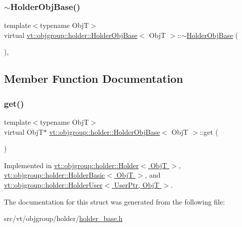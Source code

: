 \subsubsection{\texorpdfstring{$\sim$\+Holder\+Obj\+Base()}{~HolderObjBase()}}
{\footnotesize\ttfamily template$<$typename ObjT$>$ \\
virtual \hyperlink{structvt_1_1objgroup_1_1holder_1_1_holder_obj_base}{vt\+::objgroup\+::holder\+::\+Holder\+Obj\+Base}$<$ ObjT $>$\+::$\sim$\hyperlink{structvt_1_1objgroup_1_1holder_1_1_holder_obj_base}{Holder\+Obj\+Base} (\begin{DoxyParamCaption}{ }\end{DoxyParamCaption})\hspace{0.3cm}{\ttfamily [virtual]}, {\ttfamily [default]}}



\subsection{Member Function Documentation}
\mbox{\label{structvt_1_1objgroup_1_1holder_1_1_holder_obj_base_a4b350b0126259d31a62fd426a08f6698}} 
\subsubsection{\texorpdfstring{get()}{get()}}
{\footnotesize\ttfamily template$<$typename ObjT$>$ \\
virtual ObjT$\ast$ \hyperlink{structvt_1_1objgroup_1_1holder_1_1_holder_obj_base}{vt\+::objgroup\+::holder\+::\+Holder\+Obj\+Base}$<$ ObjT $>$\+::get (\begin{DoxyParamCaption}{ }\end{DoxyParamCaption})\hspace{0.3cm}{\ttfamily [pure virtual]}}



Implemented in \hyperlink{structvt_1_1objgroup_1_1holder_1_1_holder_afa4ab0b8ce4108ad94f602772697c25d}{vt\+::objgroup\+::holder\+::\+Holder$<$ Obj\+T $>$}, \hyperlink{structvt_1_1objgroup_1_1holder_1_1_holder_basic_af1d605b64e5f9d77d4b291c402133f3f}{vt\+::objgroup\+::holder\+::\+Holder\+Basic$<$ Obj\+T $>$}, and \hyperlink{structvt_1_1objgroup_1_1holder_1_1_holder_user_a102b494316b9f906a02f1c47b797e339}{vt\+::objgroup\+::holder\+::\+Holder\+User$<$ User\+Ptr, Obj\+T $>$}.



The documentation for this struct was generated from the following file\+:\begin{DoxyCompactItemize}
\item 
src/vt/objgroup/holder/\hyperlink{holder__base_8h}{holder\+\_\+base.\+h}\end{DoxyCompactItemize}
